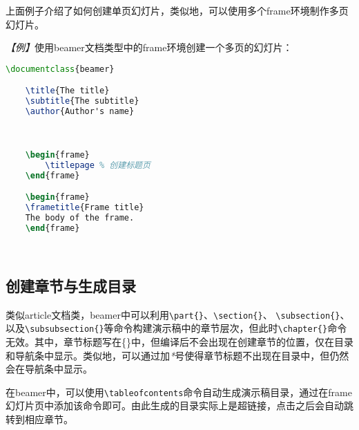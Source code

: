 上面例子介绍了如何创建单页幻灯片，类似地，可以使用多个frame环境制作多页幻灯片。

\emph{【例】}使用beamer文档类型中的frame环境创建一个多页的幻灯片：
\begin{lstlisting}[language=TeX]
    \documentclass{beamer}

    \title{The title}
    \subtitle{The subtitle}
    \author{Author's name}

    

    \begin{frame}
        \titlepage % 创建标题页
    \end{frame}

    \begin{frame}
    \frametitle{Frame title}
    The body of the frame.
    \end{frame}

    
\end{lstlisting}

\subsection{创建章节与生成目录}

类似article文档类，beamer中可以利用\texttt{\textbackslash{}part\{\}}、\texttt{\textbackslash{}section\{\}}、
\texttt{\textbackslash{}subsection\{\}}、以及\texttt{\textbackslash{}subsubsection\{\}}等命令构建演示稿中的章节层次，但此时\texttt{\textbackslash{}chapter\{\}}命令无效。其中，章节标题写在\{\}中，但编译后不会出现在创建章节的位置，仅在目录和导航条中显示。类似地，可以通过加\emph{*}号使得章节标题不出现在目录中，但仍然会在导航条中显示。

在beamer中，可以使用\texttt{\textbackslash{}tableofcontents}命令自动生成演示稿目录，通过在frame幻灯片页中添加该命令即可。由此生成的目录实际上是超链接，点击之后会自动跳转到相应章节。

